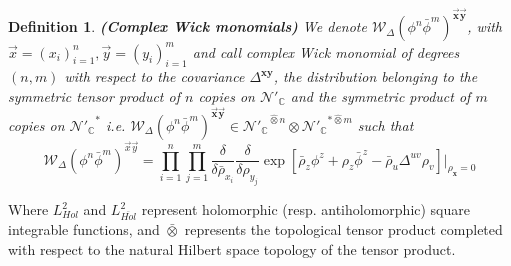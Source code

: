 \documentclass[12pt]{article}%
\newtheorem{definition}{Definition}%
\begin{document}
\begin{definition}
    \label{def:ComplexWickMonomials}{\bf (Complex Wick monomials)} 
    We denote $\mathcal{W}_\Delta(\phi^n\bar{\phi}^m)^{\vec{\mathbf{x}}\vec{\mathbf{y}}}$, with $\vec{x}=(x_i)_{i=1}^n, \vec{y}=(y_i)_{i=1}^m$ and call  complex Wick monomial of degrees $(n,m)$ with respect to the covariance $\Delta^{\mathbf{xy}}$, the distribution belonging to the symmetric tensor product of $n$ copies on $\mathcal{N}'_\mathbb{C}$ and the symmetric product of $m$ copies on ${\mathcal{N}'_\mathbb{C}}^*$ i.e. $\mathcal{W}_\Delta(\phi^n\bar{\phi}^m)^{\vec{\mathbf{x}}\vec{\mathbf{y}}}\in{\mathcal{N}'_\mathbb{C}}^{\hat{\otimes}n}\otimes {\mathcal{N}'_\mathbb{C}}^{*\hat{\otimes}m}$ such that
    \begin{equation}
    \label{eq:ComplexWienerIto}
    \mathcal{W}_\Delta(\phi^n\bar{\phi}^m)^{\vec{x}\vec{y}}=\prod_{i=1}^n\prod_{j=1}^m\frac{\delta}{\delta \bar\rho_{x_i}}\frac{\delta}{\delta \rho_{y_j}}\exp\left[{\bar\rho_z\phi^z+\rho_z\bar\phi^z-\bar\rho_u\Delta^{uv}\rho_v}\right]\bigg\lvert_{\rho_{\mathbf{x}}=0}
    \end{equation}
\end{definition}



Where $L^2_{Hol}$ and $L^2_{\overline{Hol}}$ represent holomorphic (resp. antiholomorphic) square integrable functions, and $\bar{\otimes}$ represents the topological tensor product completed with respect to the natural Hilbert space topology of the tensor product.
\end{document}
